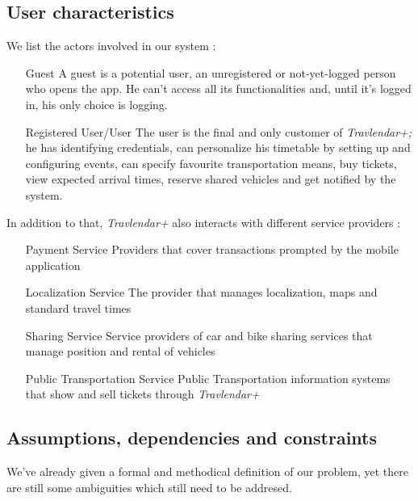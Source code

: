 			
	\subsection{User characteristics}

	We list the actors involved in our system :
	
	\begin{enumerate}
	
		\item[Guest] A guest is a potential user, an unregistered or not-yet-logged person who opens the app. He can't access all its functionalities and, until it's logged in, his only choice is logging.
		
		\item[Registered User/User] The user is the final and only customer of \textit{Travlendar+;} he has identifying credentials, can personalize his timetable by setting up and configuring events, can specify favourite transportation means, buy tickets, view expected arrival times, reserve shared vehicles and get notified by the system.

	\end{enumerate}
	
In addition to that, \textit{Travlendar+} also interacts with different service providers :
	
	\begin{enumerate}
	
		
		\item[Payment Service] Providers that cover transactions prompted by the mobile application
		\item[Localization Service] The provider that manages localization, maps and standard travel times 
		\item[Sharing Service] Service providers of car and bike sharing services that manage position and rental of vehicles
		\item[Public Transportation Service] Public Transportation information systems that show and sell tickets through \textit{Travlendar+}
	
	\end{enumerate}

		
\subsection{Assumptions, dependencies and constraints}

We've already given a formal and methodical definition of our problem, yet there are still some ambiguities which still need to be addresed.


